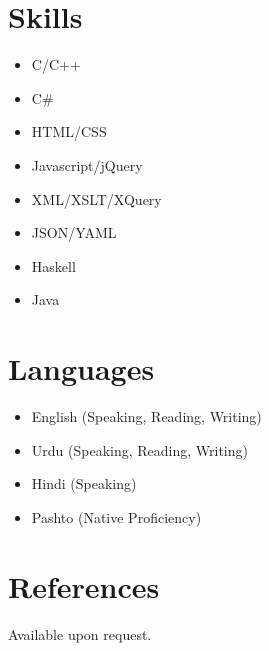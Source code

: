 \documentclass[a4paper]{article}
\begin{document}
            \section*{Skills}
                \begin{multicols}{2}
                	\begin{itemize}
                        \item C/C++
                        \item C\#
                        \item HTML/CSS
                        \item Javascript/jQuery
                        \item XML/XSLT/XQuery
                        \item JSON/YAML
                        \item Haskell
                        \item Java
                    \end{itemize}
                \end{multicols}

            \section*{Languages}
                \begin{multicols}{2}
                	\begin{itemize}
                        \item English (Speaking, Reading, Writing)
                        \item Urdu (Speaking, Reading, Writing)
                        \item Hindi (Speaking)
                        \item Pashto (Native Proficiency)
                    \end{itemize}
                \end{multicols}
            
            \section*{References}
            Available upon request.
            
        
\end{document}
